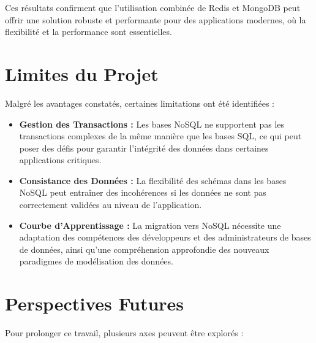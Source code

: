 Ces résultats confirment que l'utilisation combinée de Redis et MongoDB peut offrir une solution robuste et performante pour des applications modernes, où la flexibilité et la performance sont essentielles.

\section*{Limites du Projet}

Malgré les avantages constatés, certaines limitations ont été identifiées :

\begin{itemize}
  \item \textbf{Gestion des Transactions :} Les bases NoSQL ne supportent pas les transactions complexes de la même manière que les bases SQL, ce qui peut poser des défis pour garantir l'intégrité des données dans certaines applications critiques.

  \item \textbf{Consistance des Données :} La flexibilité des schémas dans les bases NoSQL peut entraîner des incohérences si les données ne sont pas correctement validées au niveau de l'application.

  \item \textbf{Courbe d'Apprentissage :} La migration vers NoSQL nécessite une adaptation des compétences des développeurs et des administrateurs de bases de données, ainsi qu'une compréhension approfondie des nouveaux paradigmes de modélisation des données.

\end{itemize}

\section*{Perspectives Futures}

Pour prolonger ce travail, plusieurs axes peuvent être explorés :

